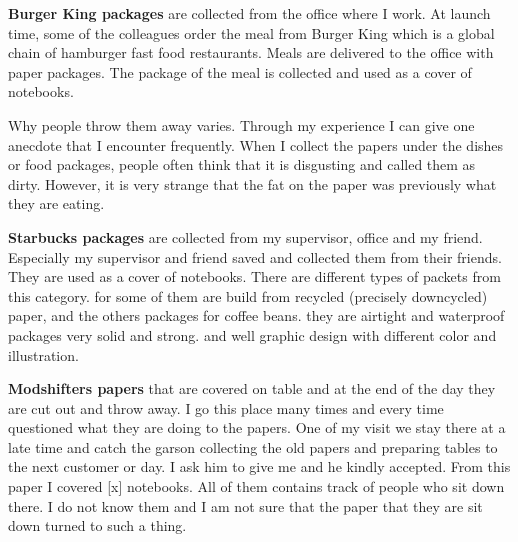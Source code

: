 
\textbf{Burger King packages} are collected from the office where I work. At launch time, some of the colleagues order the meal from Burger King which is a global chain of hamburger fast food restaurants. Meals are delivered to the office with paper packages. The package of the meal is collected and used as a cover of notebooks. 




Why people throw them away varies. Through my experience I can give one anecdote that I encounter frequently. When I collect the papers under the dishes or food packages, people often think that it is disgusting and called them as dirty. However, it is very strange that the fat on the paper was previously what they are eating.

\textbf{Starbucks packages} are collected from my supervisor, office and my friend. Especially my supervisor and friend saved and collected them from their friends. They are used as a cover of notebooks. There are different types of packets from this category. for some of them are build from recycled (precisely downcycled) paper, and the others packages for coffee beans. they are airtight and waterproof packages very solid and strong. and well graphic design with different color and illustration.

\textbf{Modshifters papers} that are covered on table and at the end of the day they are cut out and throw away. I go this place many times and every time questioned what they are doing to the papers. One of my visit we stay there at a late time and catch the garson collecting the old papers and preparing tables to the next customer or day. I ask him to give me and he kindly accepted. From this paper I covered [x] notebooks. All of them contains track of people who sit down there. I do not know them and I am not sure that the paper that they are sit down turned to such a thing.

